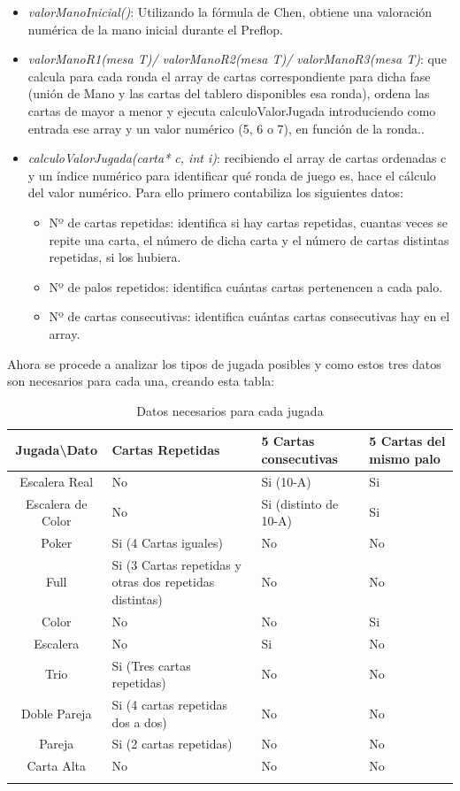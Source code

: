 \begin{itemize}
\item \textit{valorManoInicial()}: Utilizando la fórmula de Chen, obtiene una valoración numérica de la mano inicial durante  el Preflop.
\item \textit{valorManoR1(mesa T)/ valorManoR2(mesa T)/ valorManoR3(mesa T)}: que calcula para cada ronda el array de cartas correspondiente para dicha fase (unión de Mano y las cartas del tablero disponibles esa ronda), ordena las cartas de mayor a menor y ejecuta calculoValorJugada introduciendo como entrada ese array y un valor numérico (5, 6 o 7), en función de la ronda..
\item \textit{calculoValorJugada(carta* c, int i)}: recibiendo el array de cartas ordenadas c y un índice numérico para identificar qué ronda de juego es, hace el cálculo del valor numérico. Para ello primero contabiliza los siguientes datos:
\begin{itemize}
\item Nº de cartas repetidas: identifica si hay cartas repetidas, cuantas veces se repite una carta, el número de dicha carta y el número de cartas distintas repetidas, si los hubiera.
\item Nº de palos repetidos: identifica cuántas cartas pertenencen a cada palo. 
\item Nº de cartas consecutivas: identifica cuántas cartas consecutivas hay en el array.
 \end{itemize}
 \end{itemize}
Ahora se procede a analizar los tipos de jugada posibles y como estos tres datos son necesarios para cada una, creando esta tabla:

\begin{longtable}[c]{|c|m{8em}|m{8em}|m{5em}|}
\hline
\rowcolor{lightgray}Jugada\textbackslash Dato&Cartas Repetidas& 5 Cartas consecutivas & 5 Cartas del mismo palo\\
\hline
Escalera Real&No&Si (10-A)& Si\\
\hline
Escalera de Color&No&Si (distinto de 10-A)& Si\\
\hline
Poker&Si (4 Cartas iguales)& No & No\\
\hline
Full&Si (3 Cartas repetidas y otras dos repetidas distintas)& No & No\\
\hline
Color&No& No & Si\\
\hline
Escalera&No& Si & No\\
\hline
Trio&Si (Tres cartas repetidas)& No & No\\
\hline
Doble Pareja&Si (4 cartas repetidas dos a dos)& No & No\\
\hline
Pareja&Si (2 cartas repetidas)& No & No\\
\hline
Carta Alta&No& No & No\\
\hline
\caption{Datos necesarios para cada jugada}
\label{tab:tabla}
\end{longtable}

